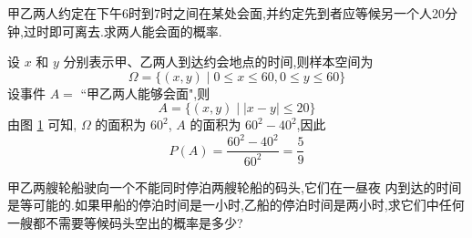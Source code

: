 
\question[会面问题] 甲乙两人约定在下午6时到7时之间在某处会面,并约定先到者应等候另一个人20分钟,过时即可离去.求两人能会面的概率.

\begin{solution}
    设 $x$ 和 $y$ 分别表示甲、乙两人到达约会地点的时间,则样本空间为
    $$
    \varOmega = \{ (x,y) \mid 0 \leqslant x \leqslant 60, 0 \leqslant y \leqslant 60 \}
    $$
    设事件 $A=$ ``甲乙两人能够会面",则
    $$
    A = \{ (x,y) \mid |x-y| \leqslant 20 \}
    $$
    由图 \ref{fig:会面问题} 可知, $\varOmega$ 的面积为 $60^2$, $A$ 的面积为 $60^2 - 40^2$,因此
    $$
    P(A) = \dfrac{60^2 - 40^2}{60^2} = \dfrac{5}{9}
    $$

    \begin{figure}[H]
        \centering


        \caption{}
        \label{fig:会面问题}
    \end{figure}
\end{solution}

\question 甲乙两艘轮船驶向一个不能同时停泊两艘轮船的码头,它们在一昼夜  内到达的时间是等可能的.如果甲船的停泊时间是一小时,乙船的停泊时间是两小时,求它们中任何一艘都不需要等候码头空出的概率是多少?

